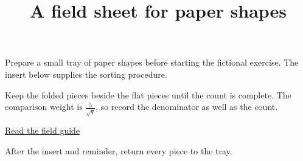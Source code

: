 \documentclass{article}
\title{A field sheet for paper shapes}
\author{}
\date{}
\begin{document}
\maketitle

Prepare a small tray of paper shapes before starting the fictional exercise.
The insert below supplies the sorting procedure.


\begin{fieldpanel}
Keep the folded pieces beside the flat pieces until the count is complete.
The comparison weight is \(\frac{5}{\sqrt{q}}\), so record the denominator
as well as the count.

\underline{\href{https://example.org/field-guide}{Read the field guide}}
\end{fieldpanel}

After the insert and reminder, return every piece to the tray.
\end{document}
